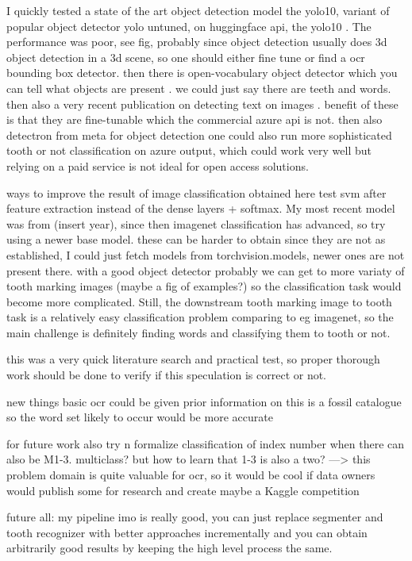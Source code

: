 \documentclass{article}
\begin{document}
I quickly tested a state of the art object detection model the yolo10, variant of popular object detector yolo\cite{redmonYouOnlyLook2016}
 untuned, on huggingface api, the yolo10 \cite{OmouredYOLOv10DocumentLayoutAnalysisHugging2023}. The performance 
was poor, see fig, probably since object detection usually does 3d object detection in a 3d scene, so one should either 
fine tune or find a ocr bounding box detector. then there is open-vocabulary object detector which you can tell what objects 
are present \cite{YOLOWorldRealTimeOpenVocabulary}. we could just say there are teeth and words. 
then also a very recent publication on detecting text on images \cite{longHierarchicalTextSpotter2024}.
benefit of these is that they are fine-tunable which the commercial azure api is not. 
then also detectron \cite{Detectron} from meta for object detection
one could also run more sophisticated 
tooth or not classification on azure output, which could work very well but relying on a paid service is not ideal 
for open access solutions.

ways to improve the result of image classification obtained here 
test svm after feature extraction instead of the dense layers + softmax. My most recent model was from (insert year),
since then imagenet classification has advanced, so try using a newer base model. these can be harder to obtain 
since they are not as established, I could just fetch models from torchvision.models, newer ones are not present there.
with a good object detector probably we can get to more variaty of tooth marking images (maybe a fig of examples?)
so the classification task would become more complicated. Still, the downstream tooth marking image to tooth task 
is a relatively easy classification problem comparing to eg imagenet, so the main challenge is definitely finding words and
classifying them to tooth or not.

this was a very quick literature search and practical test, so proper thorough work should be done to verify if this speculation 
is correct or not.

new things
basic ocr could be given prior information on this is a fossil catalogue so the word set likely to occur would be more accurate

for future work also try n formalize classification of index number
when there can also be M1-3. multiclass? but how to learn that 1-3 is also a two?
---> this problem domain is quite valuable for ocr, so it would be cool if 
data owners would publish some for research and create maybe a Kaggle competition

future all: my pipeline imo is really good, you can just replace segmenter and tooth recognizer 
with better approaches incrementally and you can obtain arbitrarily good results by 
keeping the high level process the same.

\printbibliography
\end{document}
